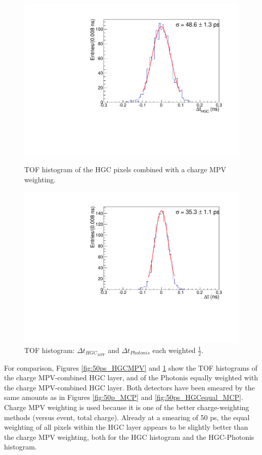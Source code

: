 \documentclass[twocolumn,aps,prd,reprint,superscriptaddress,floatfix]{revtex4-1}
\begin{document}
\begin{figure}[!htbp]
	\centering
	\includegraphics[width=\linewidth]{deltaTPicoSilLandauChargeSmear50.pdf}
	\caption{TOF histogram of the HGC pixels combined with a charge MPV weighting.}
	\label{fig:50ps_HGCMPV}

	\centering
	\includegraphics[width=\linewidth]{deltaT_PicoSilLandauCharge_MCP_Equal_BothSmear50.pdf}
	\caption{TOF histogram: $\Delta t_{HGC_{MPV}}$ and $\Delta t_{Photonis}$ each weighted $\frac{1}{2}$.}
	\label{fig:50ps_HGCMPV_MCP}
\end{figure}

For comparison, Figures \ref{fig:50ps_HGCMPV} and \ref{fig:50ps_HGCMPV_MCP} show the TOF histograms of the charge MPV-combined HGC layer, and of the Photonis equally weighted with the charge MPV-combined HGC layer.
Both detectors have been smeared by the same amounts as in Figures \ref{fig:50p_MCP} and \ref{fig:50ps_HGCequal_MCP}.
Charge MPV weighting is used because it is one of the better charge-weighting methods (versus event, total charge). 
Already at a smearing of 50 ps, the equal weighting of all pixels within the HGC layer appears to be slightly better than the charge MPV weighting, both for the HGC histogram and the HGC-Photonis histogram. 
\end{document}
